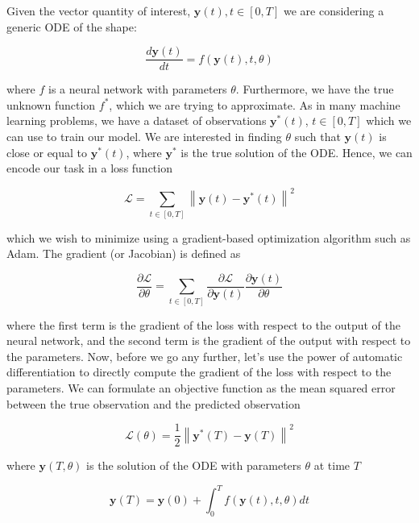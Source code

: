 \documentclass{article}
\begin{document}
{\begin{appendices}
Given the vector quantity of interest, $\mathbf{y}(t), t \in [0, T]$ we are considering a generic ODE of the shape:

\begin{equation}
\frac{d\mathbf{y}(t)}{dt} = f(\mathbf{y}(t), t, \theta)
\end{equation}

where $f$ is a neural network with parameters $\theta$. Furthermore, we have the true unknown function $f^*$, which we are trying to approximate. As in many machine learning problems, we have a dataset of observations $\mathbf{y}^*(t)$, $t \in [0, T]$ which we can use to train our model. We are interested in finding $\theta$ such that $\mathbf{y}(t)$ is close or equal to $\mathbf{y}^*(t)$, where $\mathbf{y}^*$ is the true solution of the ODE. Hence, we can encode our task in a loss function

\begin{equation}
    \mathcal{L} = \sum_{t \in [0, T]} \left\| \mathbf{y}(t) - \mathbf{y}^*(t) \right\|^2
\end{equation}

which we wish to minimize using a gradient-based optimization algorithm such as Adam. The gradient (or Jacobian) is defined as

\begin{equation}
\frac{\partial \mathcal{L}}{\partial \theta} = \sum_{t \in [0, T]} \frac{\partial \mathcal{L}}{\partial \mathbf{y}(t)} \frac{\partial \mathbf{y}(t)}{\partial \theta}
\end{equation}

where the first term is the gradient of the loss with respect to the output of the neural network, and the second term is the gradient of the output with respect to the parameters. Now, before we go any further, let's use the power of automatic differentiation to directly compute the gradient of the loss with respect to the parameters. We can formulate an objective function as the mean squared error between the true observation and the predicted observation

\begin{equation}
\mathcal{L}(\theta) = \frac{1}{2} \left\| \mathbf{y}^*(T) - \mathbf{y}(T) \right\|^2
\end{equation}

where $\mathbf{y}(T, \theta)$ is the solution of the ODE with parameters $\theta$ at time $T$

\begin{equation}
\mathbf{y}(T) = \mathbf{y}(0) + \int_0^T f(\mathbf{y}(t), t, \theta) dt
\end{equation}


\end{appendices}}
\end{document}
